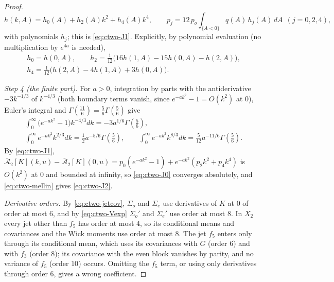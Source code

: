 \begin{proof}
\begin{equation}\label{eq:ctwo-hj}
h(k,A)=h_0(A)+h_2(A)k^2+h_4(A)k^4,\qquad p_j=12\,p_o\!\int_{\{A<0\}}q(A)\,h_j(A)\,dA\ \ (j=0,2,4),
\end{equation}
with polynomials $h_j$; this is \eqref{eq:ctwo-J1}. Explicitly, by polynomial evaluation (no multiplication by $e^{4a}$ is needed),
\begin{equation}\label{eq:ctwo-extract}
\begin{gathered}
h_0=h(0,A),\qquad h_2=\tfrac1{12}\bigl(16h(1,A)-15h(0,A)-h(2,A)\bigr),\\
h_4=\tfrac1{12}\bigl(h(2,A)-4h(1,A)+3h(0,A)\bigr).
\end{gathered}
\end{equation}

\emph{Step 4 (the finite part).} For $a>0$, integration by parts with the antiderivative $-3k^{-1/3}$ of $k^{-4/3}$ (both boundary terms vanish, since $e^{-ak^2}-1=O(k^2)$ at $0$), Euler's integral and $\Gamma(\frac{11}6)=\frac56\Gamma(\frac56)$ \cite[\S\S5.2, 5.5]{DLMF} give
\begin{equation}\label{eq:ctwo-mellin}
\begin{gathered}
\int_0^\infty\bigl(e^{-ak^2}-1\bigr)k^{-4/3}dk=-3a^{1/6}\Gamma(\tfrac56),\\
\int_0^\infty e^{-ak^2}k^{2/3}dk=\tfrac12a^{-5/6}\Gamma(\tfrac56),\qquad
\int_0^\infty e^{-ak^2}k^{8/3}dk=\tfrac5{12}a^{-11/6}\Gamma(\tfrac56).
\end{gathered}
\end{equation}
By \eqref{eq:ctwo-J1}, $\bar{\mathcal A}_2[K](k,u)-\bar{\mathcal A}_2[K](0,u)=p_0(e^{-ak^2}-1)+e^{-ak^2}(p_2k^2+p_4k^4)$ is $O(k^2)$ at $0$ and bounded at infinity, so \eqref{eq:ctwo-J0} converges absolutely, and \eqref{eq:ctwo-mellin} gives \eqref{eq:ctwo-J2}.

\emph{Derivative orders.} By \eqref{eq:ctwo-jetcov}, $\Sigma_o$ and $\Sigma_e$ use derivatives of $K$ at $0$ of order at most $6$, and by \eqref{eq:ctwo-Vexp} $\Sigma_o'$ and $\Sigma_e'$ use order at most $8$. In $X_2$ every jet other than $f_5$ has order at most $4$, so its conditional means and covariances and the Wick moments use order at most $8$. The jet $f_5$ enters only through its conditional mean, which uses its covariances with $G$ (order $6$) and with $f_3$ (order $8$); its covariance with the even block vanishes by parity, and no variance of $f_5$ (order $10$) occurs. Omitting the $f_5$ term, or using only derivatives through order $6$, gives a wrong coefficient.
\end{proof}

